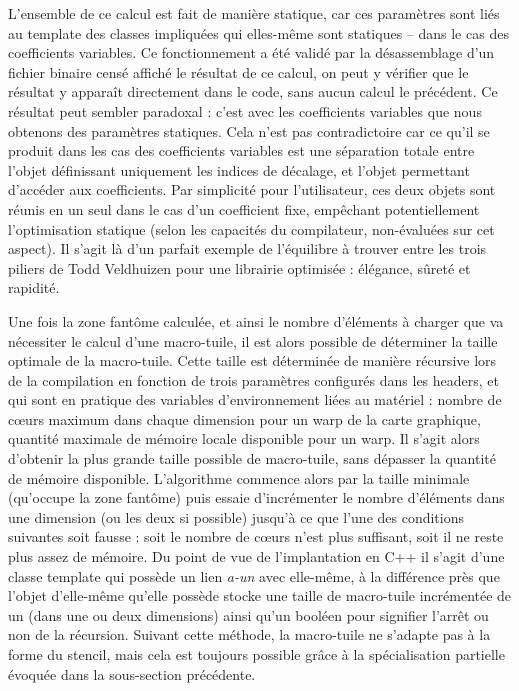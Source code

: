 L'ensemble de ce calcul est fait de manière statique, car ces paramètres sont liés au template des classes impliquées qui elles-même sont statiques -- dans le cas des coefficients variables. Ce fonctionnement a été validé par la désassemblage d'un fichier binaire censé affiché le résultat de ce calcul, on peut y vérifier que le résultat y apparaît directement dans le code, sans aucun calcul le précédent. Ce résultat peut sembler paradoxal : c'est avec les coefficients variables que nous obtenons des paramètres statiques. Cela n'est pas contradictoire car ce qu'il se produit dans les cas des coefficients variables est une séparation totale entre l'objet définissant uniquement les indices de décalage, et l'objet permettant d'accéder aux coefficients. Par simplicité pour l'utilisateur, ces deux objets sont réunis en un seul dans le cas d'un coefficient fixe, empêchant potentiellement l'optimisation statique (selon les capacités du compilateur, non-évaluées sur cet aspect). Il s'agit là d'un parfait exemple de l'équilibre à trouver entre les trois piliers de Todd Veldhuizen pour une librairie optimisée : élégance, sûreté et rapidité.

Une fois la zone fantôme calculée, et ainsi le nombre d'éléments à charger que va nécessiter le calcul d'une macro-tuile, il est alors possible de déterminer la taille optimale de la macro-tuile. Cette taille est déterminée de manière récursive lors de la compilation en fonction de trois paramètres configurés dans les headers, et qui sont en pratique des variables d'environnement liées au matériel : nombre de cœurs maximum dans chaque dimension pour un warp de la carte graphique, quantité maximale de mémoire locale disponible pour un warp. Il s'agit alors d'obtenir la plus grande taille possible de macro-tuile, sans dépasser la quantité de mémoire disponible. L'algorithme commence alors par la taille minimale (qu'occupe la zone fantôme) puis essaie d'incrémenter le nombre d'éléments dans une dimension (ou les deux si possible) jusqu'à ce que l'une des conditions suivantes soit fausse : soit le nombre de cœurs n'est plus suffisant, soit il ne reste plus assez de mémoire. Du point de vue de l'implantation en \textsf{C++} il s'agit d'une classe template qui possède un lien \emph{a-un} avec elle-même, à la différence près que l'objet d'elle-même qu'elle possède stocke une taille de macro-tuile incrémentée de un (dans une ou deux dimensions) ainsi qu'un booléen pour signifier l'arrêt ou non de la récursion. Suivant cette méthode, la macro-tuile ne s'adapte pas à la forme du stencil, mais cela est toujours possible grâce à la spécialisation partielle évoquée dans la sous-section précédente.

